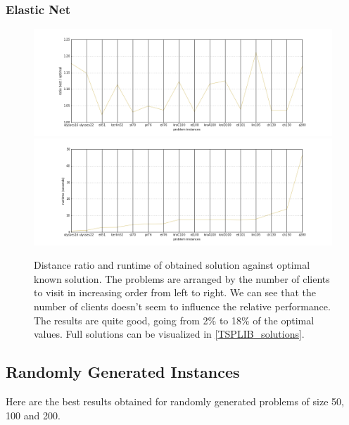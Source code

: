 \documentclass{article} %
\begin{document}
\newpage
\subsubsection{Elastic Net}

\begin{figure}[!htb]
	\includegraphics[scale=0.4]{figs/ratios}
	\includegraphics[scale=0.4]{figs/runtimes}
	\caption{\small Distance ratio and runtime of obtained solution against optimal known solution. The problems are arranged by the number of clients to visit in increasing order from left to right. We can see that the number of clients doesn't seem to influence the relative performance. The results are quite good, going from 2\% to 18\% of the optimal values. Full solutions can be visualized in \cref{TSPLIB_solutions}.}

\label{en_results}
\end{figure}



\newpage
\subsection{Randomly Generated Instances}

Here are the best results obtained for randomly generated problems of size 50, 100 and 200.
\end{document}
